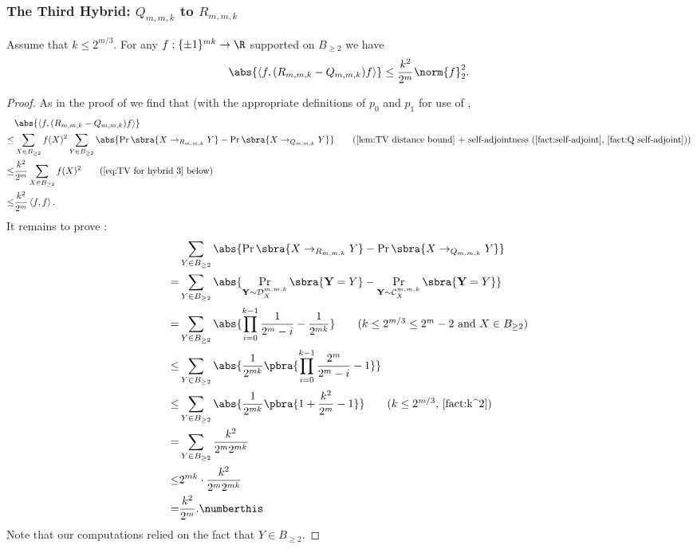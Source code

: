 \subsubsection{The Third Hybrid: $Q_{m,m,k}$ to $R_{m,m,k}$}

\begin{lemma}\label{lem:hybrid 3}
    Assume that $k\leq 2^{m/3}$. For any $f:\{\pm1\}^{mk}\to\R$ supported on $B_{\geq 2}$ we have
    \begin{align*}
        \abs{\left\langle f,(R_{m,m,k}-Q_{m,m,k})f\right\rangle} \leq \frac{k^2}{2^{m}}\norm{f}_2^2 .
    \end{align*}
\end{lemma}
\begin{proof}
    As in the proof of  we find that (with the appropriate definitions of $p_0$ and $p_1$ for use of ,
    \begin{align*}
       &\abs{\left\langle f,(R_{m,m,k}-Q_{m,m,k})f\right\rangle}\\
       \leq & \sum_{X\in B_{\geq 2}}f(X)^2\sum_{Y\in B_{\geq 2}}\abs{\Pr\sbra{X\to_{R_{m,m,k}} Y}-\Pr\sbra{X\to_{Q_{m,m,k}} Y}}\tag{\Cref{lem:TV distance bound} + self-adjointness (\Cref{fact:self-adjoint}, \Cref{fact:Q self-adjoint})}\\
        \leq & \frac{k^2}{2^m}\sum_{X\in B_{\geq 2}}f(X)^2\tag{\Cref{eq:TV for hybrid 3} below}\\
        \leq & \frac{k^2}{2^m}\left\langle f,f\right\rangle.
    \end{align*}
    It remains to prove :
    \begin{align*}
        &\sum_{Y\in B_{\geq 2}}\abs{\Pr\sbra{X\to_{R_{m,m,k}} Y}-\Pr\sbra{X\to_{Q_{m,m,k}} Y}}\\
        =&\sum_{Y\in B_{\geq 2}}\abs{\Pr_{\mathbf{Y}\sim\mathcal{D}^{m,m,k}_X}\sbra{\mathbf{Y}=Y}-\Pr_{\mathbf{Y}\sim\mathcal{C}^{m,m,k}_X}\sbra{\mathbf{Y}=Y}}\\
        =&\sum_{Y\in B_{\geq 2}}\abs{ \prod_{i=0}^{k-1}\frac{1}{2^{m}-i}- \frac1{2^{mk}}}\tag{$k\leq 2^{m/3}\leq 2^m-2$ and $X\in B_{\geq 2}$}\\
        \leq &\sum_{Y\in B_{\geq 2}}\abs{ \frac1{2^{mk}}\pbra{\prod_{i=0}^{k-1}\frac{2^{m}}{2^{m}-i}- 1}}\\
        \leq &\sum_{Y\in B_{\geq 2}}\abs{ \frac1{2^{mk}}\pbra{1+\frac{k^2}{2^m}- 1}}\tag{$k\leq 2^{m/3}$, \Cref{fact:k^2}}\\
        = &\sum_{Y\in B_{\geq 2}} \frac{k^2}{2^m2^{mk}}\\
        \leq &{2^{mk}}\cdot \frac{k^2}{2^m2^{mk}}\\
        =& \frac{k^2}{2^m}.\numberthis\label{eq:TV for hybrid 3}
    \end{align*}
    Note that our computations relied on the fact that $Y\in B_{\geq 2}$.
\end{proof}




